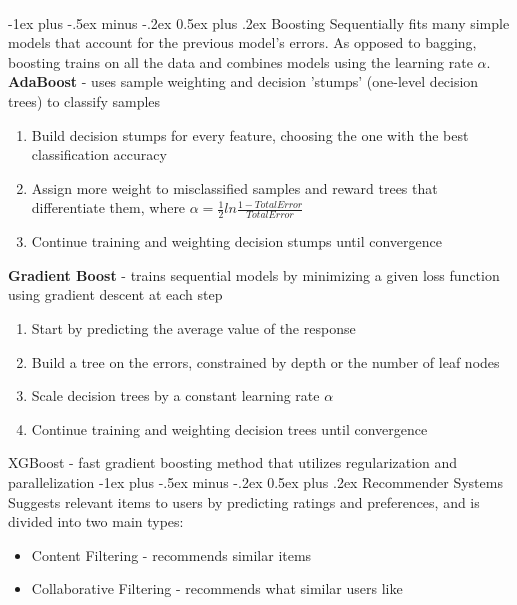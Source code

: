 \documentclass[10pt,landscape]{article}
\makeatletter
\renewcommand{\section}{\@startsection{section}{1}{0mm}%
                                {-1ex plus -.5ex minus -.2ex}%
                                {0.5ex plus .2ex}%
                                {\normalfont\large\bfseries}}
\makeatother
\begin{document}
\begin{multicols}{3}
\columnbreak
\textcolor{white}{.}\vspace{-3mm}\\ %
\section{Boosting}
Sequentially fits many simple models that account for the previous model's errors. As opposed to bagging, boosting trains on all the data and combines models using the learning rate $\alpha$. \\
\smallskip
\textbf{AdaBoost} - uses sample weighting and decision 'stumps' (one-level decision trees) to classify samples
\begin{enumerate}[leftmargin=5mm]
\itemsep -.4mm
\item Build decision stumps for every feature, choosing the one with the best classification accuracy
\item Assign more weight to misclassified samples and reward trees that differentiate them, where  $\alpha = \frac{1}{2}ln\frac{1-TotalError}{TotalError}$
\item Continue training and weighting decision stumps until convergence
\end{enumerate}

\textbf{Gradient Boost} - trains sequential models by minimizing a given loss function using gradient descent at each step
\begin{enumerate}[leftmargin=5mm]
\itemsep -.4mm
\item Start by predicting the average value of the response
\item Build a tree on the errors, constrained by depth or the number of leaf nodes
\item Scale decision trees by a constant learning rate $\alpha$
\item Continue training and weighting decision trees until convergence
\end{enumerate}

XGBoost - fast gradient boosting method that utilizes regularization and parallelization
\section{Recommender Systems}
Suggests relevant items to users by predicting ratings and preferences, and is divided into two main types:
\begin{itemize}[label={--},leftmargin=4mm]
\itemsep -.4mm
\item Content Filtering - recommends similar items
\item Collaborative Filtering - recommends what similar users like
\end{itemize}


\end{multicols}
\end{document}
